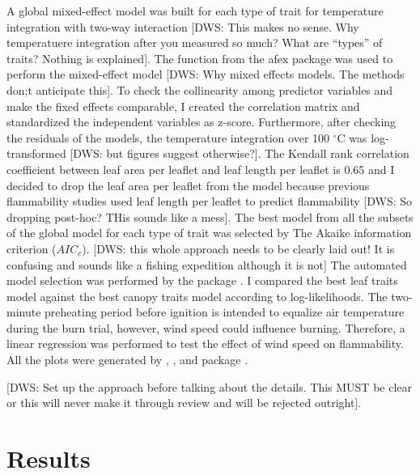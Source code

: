 \documentclass[12pt]{report}
\begin{document}
A global mixed-effect model was built for each type of trait for temperature integration with two-way interaction [DWS: This makes no sense. Why temperatuere integration after you measured so much? What are ``types'' of traits?  Nothing is explained]. The  function from the afex package \citep{singmann2015packageafex,afexluke2017evaluating} was used to perform the mixed-effect model [DWS: Why mixed effects models. The methods don;t anticipate this]. To check the collinearity among predictor variables and make the fixed effects comparable, I created the correlation matrix and standardized the independent variables as z-score. Furthermore, after checking the residuals of the models, the temperature integration over 100 $^{\circ}$C was log-transformed [DWS: but figures suggest otherwise?]. The Kendall rank correlation coefficient between leaf area per leaflet and leaf length per leaflet is 0.65 and I decided to drop the leaf area per leaflet from the model because previous flammability studies used leaf length per leaflet to predict flammability [DWS: So dropping post-hoc? THis sounds like a mess]. The best model from all the subsets of the global model for each type of trait was selected by The Akaike information criterion ($AIC_{c}$). [DWS: this whole approach needs to be clearly laid out! It is confusing and sounds like a fishing expedition although it is not] The automated model selection was performed by the  package \citep{barton2015packagemumin}. I compared the best leaf traits model against the best canopy traits model according to log-likelihoods. The two-minute preheating period before ignition is intended to equalize air temperature during the burn trial, however, wind speed could influence burning. Therefore, a linear regression was performed to test the effect of wind speed on flammability. All the plots were generated by , , and  package \citep{wickham2016packageggplot2, kassambara2017packagefactoextra,kassambara2020package}.

[DWS: Set up the approach before talking about the details. This MUST be clear or this will never make it through review and will be rejected outright].

\section{Results}
\end{document}
